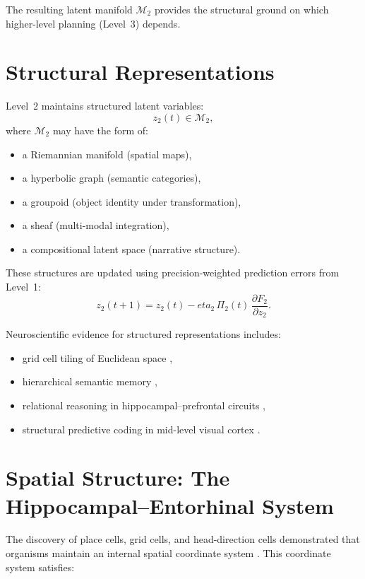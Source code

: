 \documentclass[12pt,oneside]{book}
\theoremstyle{plain}
\theoremstyle{definition}
\let\citep\parencite
\def\eta{eta}%
\begin{document}
The resulting latent manifold $\mathcal{M}_2$ provides the structural
ground on which higher-level planning (Level~3) depends.

\section{Structural Representations}

Level~2 maintains structured latent variables:
\[
z_2(t) \in \mathcal{M}_2,
\]
where $\mathcal{M}_2$ may have the form of:

\begin{itemize}
  \item a Riemannian manifold (spatial maps),
  \item a hyperbolic graph (semantic categories),
  \item a groupoid (object identity under transformation),
  \item a sheaf (multi-modal integration),
  \item a compositional latent space (narrative structure).
\end{itemize}

These structures are updated using precision-weighted prediction errors
from Level~1:
\[
z_2(t+1)
= z_2(t)
  - \eta_2 \, \Pi_2(t) \,
    \frac{\partial F_2}{\partial z_2}.
\]

Neuroscientific evidence for structured representations includes:

\begin{itemize}
  \item grid cell tiling of Euclidean space \citep{hafting2005grid},
  \item hierarchical semantic memory \citep{rogers2004semantic},
  \item relational reasoning in hippocampal–prefrontal circuits
    \citep{eichenbaum2017prefrontal},
  \item structural predictive coding in mid-level visual cortex
    \citep{zimmermann2018predictive}.
\end{itemize}

\section{Spatial Structure: The Hippocampal–Entorhinal System}

The discovery of place cells, grid cells, and head-direction cells
demonstrated that organisms maintain an internal spatial coordinate
system \citep{o2005hippocampal,moser2008place}.
This coordinate system satisfies:
\end{document}
